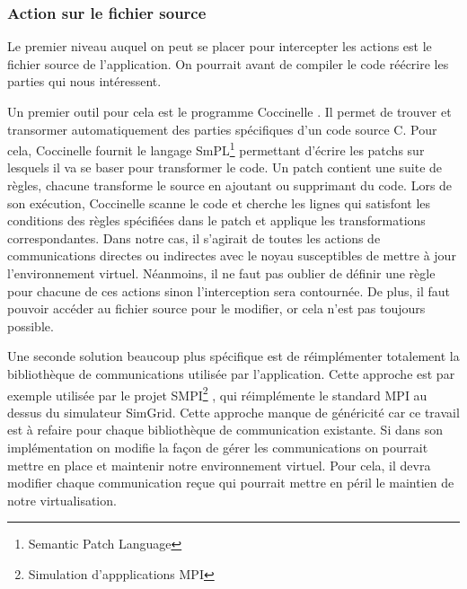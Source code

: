 \subsubsection{Action sur le fichier source}
\label{section:source}
Le premier niveau auquel on peut se placer pour intercepter les actions est le fichier source de l'application. On pourrait avant de compiler le code réécrire les parties qui nous intéressent.

Un premier outil pour cela est le programme Coccinelle \citep{cocci}. Il permet de trouver et transormer automatiquement des parties spécifiques d'un code source C. Pour cela, Coccinelle fournit le langage SmPL\footnote{Semantic Patch Language} permettant d'écrire les patchs sur lesquels il va se baser pour transformer le code. Un patch contient une suite de règles, chacune transforme le source en ajoutant ou supprimant du code. Lors de son exécution, Coccinelle scanne le code et cherche les lignes qui satisfont les conditions des règles spécifiées dans le patch et applique les transformations correspondantes. Dans notre cas, il s'agirait de toutes les actions de communications directes ou indirectes avec le noyau susceptibles de mettre à jour l'environnement virtuel. Néanmoins, il ne faut pas oublier de définir une règle pour chacune de ces actions sinon l'interception sera contournée. De plus, il faut pouvoir accéder au fichier source pour le modifier, or cela n'est pas toujours possible.

Une seconde solution beaucoup plus spécifique est de réimplémenter totalement la bibliothèque de communications utilisée par l'application. Cette approche est par exemple utilisée par le projet SMPI\footnote{Simulation d'appplications MPI} \citep{SMPI, clauss2011single}, qui réimplémente le standard MPI au dessus du simulateur SimGrid. Cette approche manque de  généricité car ce travail est à refaire pour chaque bibliothèque de communication existante. Si dans son implémentation on modifie la façon de gérer les communications on pourrait mettre en place et maintenir notre environnement virtuel. Pour cela, il devra modifier chaque communication reçue qui pourrait mettre en péril le maintien de notre virtualisation.

